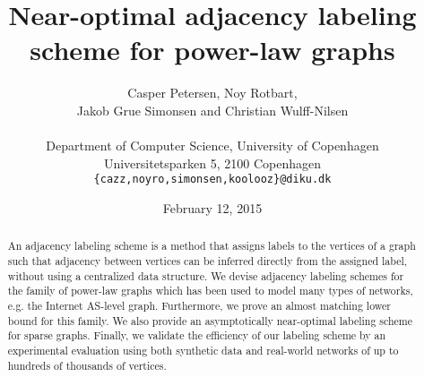 \documentclass{article}
\date{February 12, 2015}
\title{Near-optimal adjacency labeling scheme for power-law graphs}
\author{Casper Petersen, Noy Rotbart,\\ Jakob Grue Simonsen and Christian Wulff-Nilsen \\ \\
\small{Department of Computer Science, University of Copenhagen} \\
\small{Universitetsparken 5, 2100 Copenhagen}\\
 \small{\texttt{\{cazz,noyro,simonsen,koolooz\}@diku.dk}} \\
 }
\theoremstyle{remark}
\begin{document}
\begin{titlepage}
\clearpage\maketitle
\thispagestyle{empty}
\begin{abstract}
An adjacency labeling scheme is a method that assigns labels to the vertices of a graph such that adjacency between vertices 
can be inferred directly from the assigned label, without using a  centralized data structure.
We devise adjacency labeling schemes for  the family  of power-law graphs which  has been used to model many types of networks, e.g. the Internet AS-level graph. Furthermore, we  prove an almost matching  lower bound for this family.
We also provide an asymptotically near-optimal  labeling scheme for sparse graphs.
Finally, we validate the efficiency of our labeling scheme by  an experimental evaluation  using both synthetic data and real-world networks of up to hundreds of thousands of vertices. 

\end{abstract}
\end{titlepage}
\newpage







\newpage
 

\newpage
\appendix


%
\end{document}
